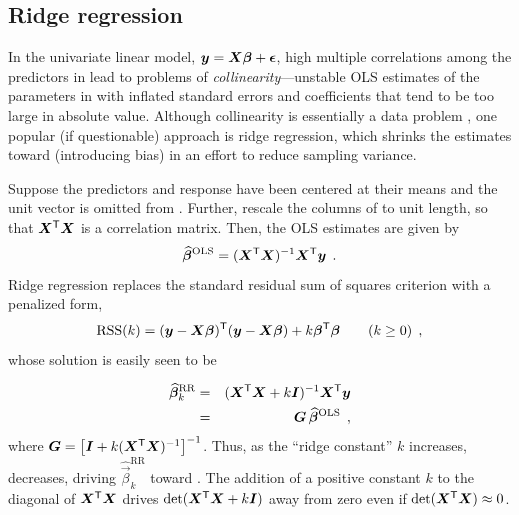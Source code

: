\subsection{Ridge regression}\label{sec:ridge}

In the univariate linear model, $\bm{y} = \bm{X} \bm{\beta} + \bm{\epsilon}$,
high multiple correlations among the predictors in  lead to problems
of \emph{collinearity}---unstable OLS
estimates of the parameters in \vec{\beta} with inflated standard errors
and coefficients that tend to be too large in absolute value.
Although collinearity is essentially a data problem
\citep{Fox:2008},
one popular (if questionable) approach is ridge regression, which shrinks the estimates toward
 (introducing bias) in an effort to reduce sampling variance.


Suppose the predictors and response have been centered at their means and the unit vector is
omitted from . Further, rescale the columns of  to unit length, so that $\bm{X}^\mathsf{T} \bm{X}$ is a correlation matrix.
Then, the OLS estimates are given by
\begin{equation}
\widehat{\bm{\beta}}^{\mathrm{OLS}} = (\bm{X}^\mathsf{T} \bm{X})^{-1} \bm{X}^\mathsf{T} \bm{y} \:\: .
\end{equation}
Ridge regression replaces the standard residual sum of squares criterion with a penalized
form,
\begin{equation}
\mathrm{RSS}(k) = (\bm{y}-\bm{X} \bm{\beta}) ^\mathsf{T}  (\bm{y}-\bm{X} \bm{\beta}) + k \bm{\beta}^\mathsf{T}\bm{\beta} \quad\quad (k \ge 0)
 \:\: , \label{eq:ridgeRSS}
\end{equation}
whose solution is easily seen to be

\begin{eqnarray}
\widehat{\bm{\beta}}^{\mathrm{RR}}_k  & = &(\bm{X}^\mathsf{T} \bm{X} + k \bm{I})^{-1} \bm{X}^\mathsf{T} \bm{y}  \label{eq:ridge-beta} \\
                                    & = & \bm{G} \, \widehat{\bm{\beta}}^{\mathrm{OLS}}  \nonumber \:\: ,
\end{eqnarray}
where $\bm{G} = \left[\bm{I} + k (\bm{X}^\mathsf{T} \bm{X})^{-1} \right] ^{-1}$.
Thus, as the ``ridge constant'' $k$ increases,  decreases, driving $\widehat{\vec{\beta}}^{\mathrm{RR}}_k$ toward 
\citep{HoerlKennard:1970a,HoerlKennard:1970b}.  The addition of a positive constant $k$ to the diagonal of $\bm{X}^\mathsf{T}\bm{X}$
drives $\mathrm{det} (\bm{X}^\mathsf{T}\bm{X}+ k \bm{I})$ away from zero even if $\mathrm{det} (\bm{X}^\mathsf{T}\bm{X})\approx 0$.

